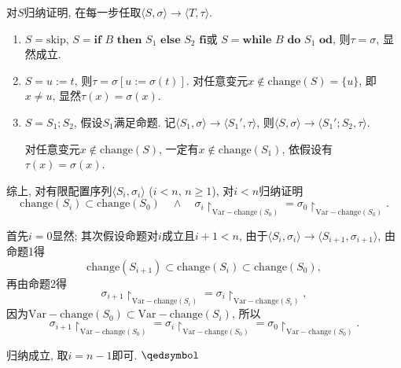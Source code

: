 \documentclass[UTF8]{ctexart}
\begin{document}
\vspace{3pt}
对$S$归纳证明, 在每一步任取$\langle S,\sigma\rangle\to\langle T,\tau\rangle$.
\begin{enumerate}
    \item $S=\mathrm{skip}$, $S=\mathbf{if}\,\,B\,\,\mathbf{then}\,\,S_1\,\,
    \mathbf{else}\,\,S_2\,\,\mathbf{fi}$或
    $S=\mathbf{while}\,\,B\,\,\mathbf{do}\,\,S_1\,\,\mathbf{od}$,
    则$\tau=\sigma$, 显然成立.

    \item $S=u:=t$, 则$\tau=\sigma[u:=\sigma(t)]$.
    对任意变元$x\notin\mathrm{change}(S)=\{u\}$, 即$x\neq u$,
    显然$\tau(x)=\sigma(x)$.

    \item $S=S_1;S_2$, 假设$S_1$满足命题. 记$\langle S_1,\sigma\rangle\to
    \langle S_1',\tau\rangle$, 则$\langle S,\sigma\rangle\to
    \langle S_1';S_2,\tau\rangle$.
    
    \hspace{2.17em}
    对任意变元$x\notin\mathrm{change}(S)$,
    一定有$x\notin\mathrm{change}(S_1)$, 依假设有$\tau(x)=\sigma(x)$.
\end{enumerate}

\vspace{5pt}

综上, 对有限配置序列$\langle S_i,\sigma_i\rangle$ ($i<n,\,n\geqslant 1$),
对$i<n$归纳证明
\[
    \mathrm{change}(S_i)\subset\mathrm{change}(S_0)\quad\land\quad
    \sigma_i\!\restriction_{\mathrm{Var}-\mathrm{change}(S_0)}=
    \sigma_0\!\restriction_{\mathrm{Var}-\mathrm{change}(S_0)}.
\]

首先$i=0$显然; 其次假设命题对$i$成立且$i+1<n$,
由于$\langle S_i,\sigma_i\rangle\to\langle S_{i+1},\sigma_{i+1}\rangle$,
由命题1得
\[
    \mathrm{change}(S_{i+1})\subset\mathrm{change}(S_i)
    \subset\mathrm{change}(S_0),
\]
再由命题2得
\[
    \sigma_{i+1}\!\restriction_{\mathrm{Var}-\mathrm{change}(S_i)}=
    \sigma_i\!\restriction_{\mathrm{Var}-\mathrm{change}(S_i)},
\]
因为$\mathrm{Var}-\mathrm{change}(S_0)\subset
\mathrm{Var}-\mathrm{change}(S_i)$, 所以
\[
    \sigma_{i+1}\!\restriction_{\mathrm{Var}-\mathrm{change}(S_0)}=
    \sigma_i\!\restriction_{\mathrm{Var}-\mathrm{change}(S_0)}=
    \sigma_0\!\restriction_{\mathrm{Var}-\mathrm{change}(S_0)}.
\]

\vspace{3pt}
归纳成立, 取$i=n-1$即可. \hfill $\qedsymbol$





\newpage
\end{document}
